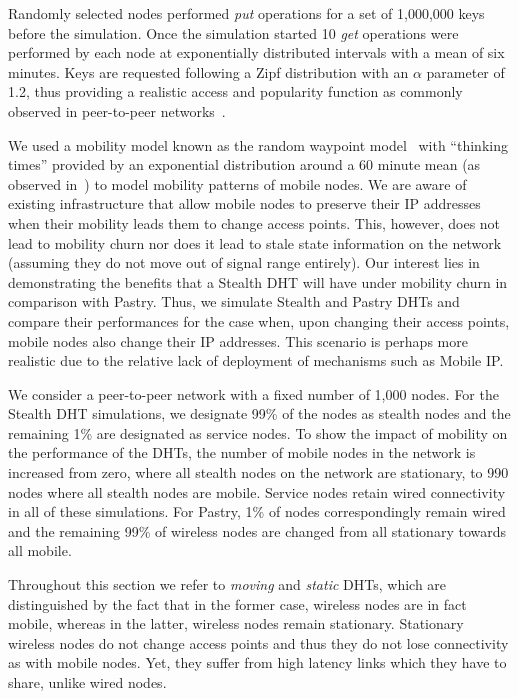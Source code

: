\documentclass[times, 10pt,twocolumn]{article}
\begin{document}

Randomly selected nodes performed \emph{put} operations for a set of
1,000,000 keys before the simulation. Once the simulation started 10
\emph{get} operations were performed by each node at exponentially
distributed intervals with a mean of six minutes. Keys are requested
following a Zipf distribution with an $\alpha$ parameter of 1.2,
thus providing a realistic access and popularity function as
commonly observed in peer-to-peer networks~\cite{zipf}.

We used a mobility model known as the random waypoint
model~\cite{johnson96dynamic} with ``thinking times'' provided by an
exponential distribution around a 60 minute mean (as observed
in~\cite{kotz:campus}) to model mobility patterns of mobile nodes.
We are aware of existing infrastructure that allow mobile nodes to
preserve their IP addresses when their mobility leads them to change
access points. This, however, does not lead to mobility churn nor
does it lead to stale state information on the network (assuming
they do not move out of signal range entirely). Our interest lies in
demonstrating the benefits that a Stealth DHT will have under
mobility churn in comparison with Pastry. Thus, we simulate Stealth
and Pastry DHTs and compare their performances for the case when,
upon changing their access points, mobile nodes also change their IP
addresses. This scenario is perhaps more realistic due to the
relative lack of deployment of mechanisms such as Mobile IP.

We consider a peer-to-peer network with a fixed number of 1,000
nodes. For the Stealth DHT simulations, we designate 99\% of the
nodes as stealth nodes and the remaining 1\% are designated as
service nodes. To show the impact of mobility on the performance of
the DHTs, the number of mobile nodes in the network is increased
from zero, where all stealth nodes on the network are stationary, to
990 nodes where all stealth nodes are mobile. Service nodes retain
wired connectivity in all of these simulations. For Pastry, 1\% of
nodes correspondingly remain wired and the remaining 99\% of
wireless nodes are changed from all stationary towards all mobile.

Throughout this section we refer to {\em moving} and {\em static}
DHTs, which are distinguished by the fact that in the former case,
wireless nodes are in fact mobile, whereas in the latter, wireless
nodes remain stationary. Stationary wireless nodes do not change
access points and thus they do not lose connectivity as with mobile
nodes. Yet, they suffer from high latency links which they have to
share, unlike wired nodes.
\end{document}

